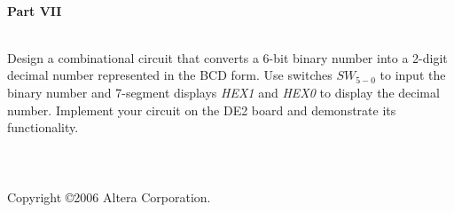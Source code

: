 \documentclass[psfig,10pt,fullpage]{article}
\begin{document}
~\\
\noindent
{\bf Part VII}

~\\
\noindent
Design a combinational circuit that converts a 6-bit binary number into 
a 2-digit decimal number represented in the BCD form. 
Use switches $SW_{5-0}$ to input the binary number and 7-segment displays 
{\it HEX1} and {\it HEX0} to display the decimal number.
Implement your circuit on the DE2 board and demonstrate its functionality.
~\\
~\\
~\\
~\\
Copyright \copyright 2006 Altera Corporation. 
\end{document}
